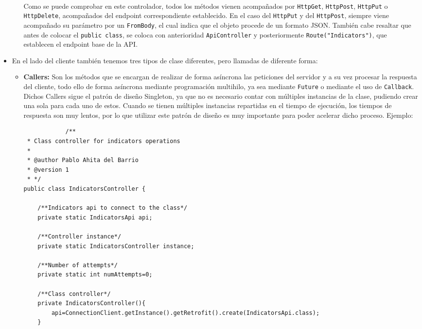 \begin{itemize}
\begin{itemize}
\begin{lstlisting}
            
        \end{lstlisting}
        Como se puede comprobar en este controlador, todos los métodos vienen
        acompañados por \texttt{HttpGet}, \texttt{HttpPost}, \texttt{HttpPut} o
        \texttt{HttpDelete}, acompañados del endpoint correspondiente
        establecido. En el caso del \texttt{HttpPut} y del \texttt{HttpPost}, siempre viene acompañado
        su parámetro por un \texttt{FromBody}, el cual indica que el objeto
        procede de un formato JSON. También cabe resaltar que antes de colocar
        el \texttt{public class}, se coloca con anterioridad
        \texttt{ApiController} y posteriormente \texttt{Route("Indicators")},
        que establecen el endpoint base de la API.
    \end{itemize}
    \item En el lado del cliente también tenemos tres tipos de clase diferentes, pero llamadas de diferente forma:
    \begin{itemize}
        \item \textbf{Callers: }Son los métodos que se encargan de realizar de
        forma asíncrona las peticiones del servidor y a su vez procesar la
        respuesta del cliente, todo ello de forma asíncrona mediante
        programación multihilo, ya sea mediante \texttt{Future} o mediante el
        uso de \texttt{Callback}. Dichos Callers sigue el patrón de diseño
        Singleton, ya que no es necesario contar con múltiples instancias de la
        clase, pudiendo crear una sola para cada uno de estos. Cuando se tienen
        múltiples instancias repartidas en el tiempo de ejecución, los tiempos
        de respuesta son muy lentos, por lo que utilizar este patrón de diseño
        es muy importante para poder acelerar dicho proceso. Ejemplo:
        \begin{lstlisting}
            /**
 * Class controller for indicators operations
 *
 * @author Pablo Ahita del Barrio
 * @version 1
 * */
public class IndicatorsController {

    /**Indicators api to connect to the class*/
    private static IndicatorsApi api;

    /**Controller instance*/
    private static IndicatorsController instance;

    /**Number of attempts*/
    private static int numAttempts=0;

    /**Class controller*/
    private IndicatorsController(){
        api=ConnectionClient.getInstance().getRetrofit().create(IndicatorsApi.class);
    }


\end{lstlisting}
\end{itemize}
\end{itemize}
